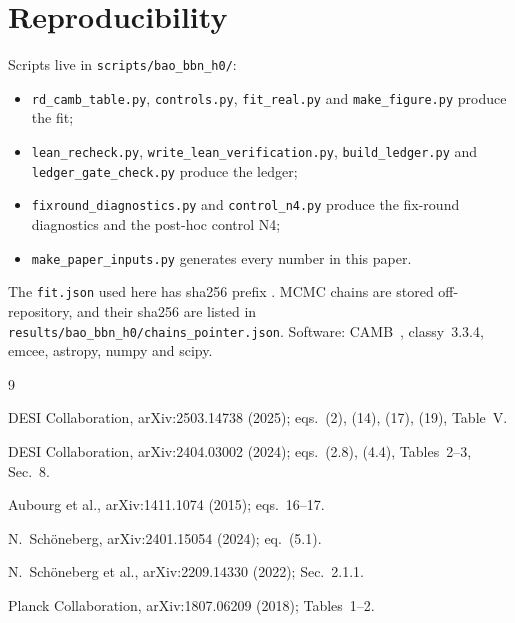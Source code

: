 \documentclass[11pt]{article}
\begin{document}
\section*{Reproducibility}
Scripts live in \texttt{scripts/bao\_bbn\_h0/}:
\begin{itemize}
\item \texttt{rd\_camb\_table.py}, \texttt{controls.py},
  \texttt{fit\_real.py} and \texttt{make\_figure.py} produce the fit;
\item \texttt{lean\_recheck.py}, \texttt{write\_lean\_verification.py},
  \texttt{build\_ledger.py} and \texttt{ledger\_gate\_check.py} produce the
  ledger;
\item \texttt{fixround\_diagnostics.py} and \texttt{control\_n4.py} produce
  the fix-round diagnostics and the post-hoc control N4;
\item \texttt{make\_paper\_inputs.py} generates every number in this paper.
\end{itemize}
The \texttt{fit.json} used here has sha256 prefix
\texttt{\FitShaShort}. MCMC chains are stored off-repository, and their
sha256 are listed in \texttt{results/bao\_bbn\_h0/chains\_pointer.json}.
Software: CAMB~\CambVer, classy~3.3.4, emcee, astropy, numpy and scipy.

\begin{thebibliography}{9}

DESI Collaboration, arXiv:2503.14738 (2025); eqs.~(2), (14), (17), (19), Table~V.

DESI Collaboration, arXiv:2404.03002 (2024); eqs.~(2.8), (4.4), Tables~2--3, Sec.~8.

Aubourg et al., arXiv:1411.1074 (2015); eqs.~16--17.

N.~Sch\"oneberg, arXiv:2401.15054 (2024); eq.~(5.1).

N.~Sch\"oneberg et al., arXiv:2209.14330 (2022); Sec.~2.1.1.

Planck Collaboration, arXiv:1807.06209 (2018); Tables~1--2.

\end{thebibliography}
\end{document}
